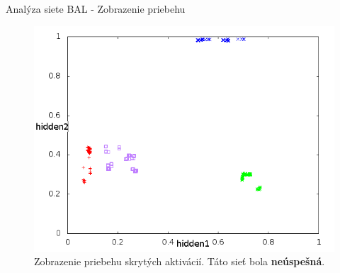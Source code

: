 \documentclass[xcolor=dvipsnames]{beamer}
\begin{document}
\begin{frame}{Analýza siete BAL - Zobrazenie priebehu}
  \begin{figure}[h!]  
    \centering
    \includegraphics[scale=0.4]{img/non-convergent.png}
    \caption{{\small Zobrazenie priebehu skrytých aktivácií. Táto sieť bola {\bf neúspešná}.}} 
  \end{figure} 
\end{frame}
\end{document}
